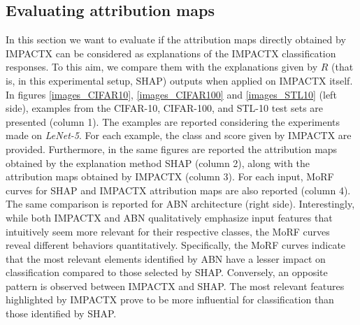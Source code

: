 


\subsection{Evaluating attribution maps}
In this section we want to evaluate if the attribution maps directly obtained by IMPACTX can be considered as explanations of the IMPACTX classification responses. To this aim, we compare them with the explanations given by $R$ (that is, in this experimental setup, SHAP) outputs when applied on IMPACTX itself.  
In figures \ref{images_CIFAR10}, \ref{images_CIFAR100} and \ref{images_STL10}
(left side), examples from the CIFAR-10, CIFAR-100, and STL-10 test sets are presented (column 1). The examples are reported considering the experiments made on \textit{LeNet-5}. For each example, the class and score given by IMPACTX are provided. Furthermore, in the same figures are reported the attribution maps obtained by the explanation method SHAP (column 2), along with the attribution maps  obtained by IMPACTX (column 3). For each input, MoRF curves for SHAP and IMPACTX attribution maps are also reported (column 4). The same comparison is  reported for ABN architecture (right side). Interestingly, while both IMPACTX and ABN qualitatively emphasize input features that intuitively seem more relevant for their respective classes, the MoRF curves reveal different behaviors quantitatively. Specifically, the MoRF curves indicate that the most relevant elements identified by ABN have a lesser impact on classification compared to those selected by SHAP. Conversely, an opposite pattern is observed between IMPACTX and SHAP. The most relevant features highlighted by IMPACTX prove to be more influential for classification than those identified by SHAP. %
